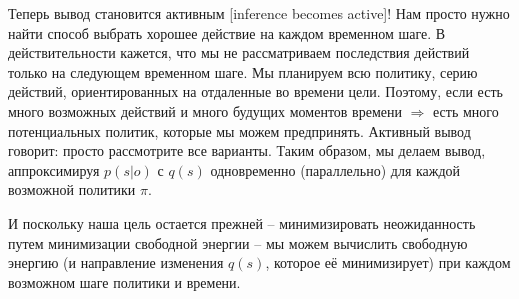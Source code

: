 \documentclass[twoside,leqno, 11pt]{article}
\begin{document}
	\begin{figure}[h]	
		\label{ris:image}
	\end{figure}
	
	Теперь вывод становится активным [inference becomes active]! Нам просто нужно найти способ выбрать хорошее действие на каждом временном шаге. В действительности кажется, что мы не рассматриваем последствия действий только на следующем временном шаге. Мы планируем всю политику, серию действий, ориентированных на отдаленные во времени цели. Поэтому, если есть много возможных действий и много будущих моментов времени $\Rightarrow$ есть много потенциальных политик, которые мы можем предпринять. Активный вывод говорит: просто рассмотрите все варианты. Таким образом, мы делаем вывод, аппроксимируя $p(s|o)$ с $q(s)$ одновременно (параллельно) для каждой возможной политики $\pi$.

	\begin{figure}[h]	
		\label{ris:image}
	\end{figure}
	
	И поскольку наша цель остается прежней -- минимизировать неожиданность путем минимизации свободной энергии -- мы можем вычислить свободную энергию (и направление изменения $q(s)$, которое её минимизирует) при каждом возможном шаге политики и времени.
	
\end{document}
